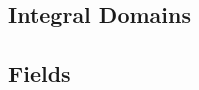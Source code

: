 \documentclass{article}
\begin{document}
  \subsection{Integral Domains}


  \subsection{Fields}
\end{document}
